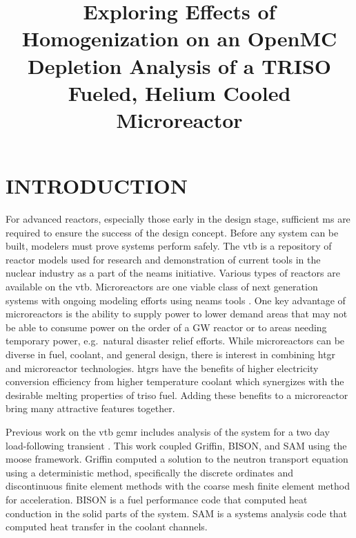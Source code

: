 \documentclass[letterpaper]{physor2024}
\title{Exploring Effects of Homogenization on an OpenMC Depletion Analysis of a TRISO Fueled, Helium Cooled Microreactor}
\begin{document}
\section{INTRODUCTION}\label{sec:intro}
For advanced reactors, especially those early in the design stage, sufficient \gls{ms} are required to ensure the success of the design concept. Before any system can be built, modelers must prove systems perform safely. The \gls{vtb} \cite{vtb2023} is a repository of reactor models used for research and demonstration of current tools in the nuclear industry as a part of the \gls{neams} initiative. Various types of reactors are available on the \gls{vtb}. Microreactors are one viable class of next generation systems with ongoing modeling efforts using \gls{neams} tools \cite{Stauff-preliminary-applications-2021, Stauff-applications-2022}. One key advantage of microreactors is the ability to supply power to lower demand areas that may not be able to consume power on the order of a GW reactor or to areas needing temporary power, e.g.~natural disaster relief efforts. While microreactors can be diverse in fuel, coolant, and general design, there is interest in combining \gls{htgr} and microreactor technologies. \glspl{htgr} have the benefits of higher electricity conversion efficiency from higher temperature coolant which synergizes with the desirable melting properties of \gls{triso} fuel. Adding these benefits to a microreactor bring many attractive features together.

Previous work on the \gls{vtb} \gls{gcmr} includes analysis of the system for a two day load-following transient \cite{Abdelhameed-ANS-2022}. This work coupled Griffin, BISON, and SAM using the \gls{moose} framework. Griffin computed a solution to the neutron transport equation using a deterministic method, specifically the discrete ordinates and discontinuous finite element methods with the coarse mesh finite element method for acceleration. BISON is a fuel performance code that computed heat conduction in the solid parts of the system. SAM is a systems analysis code that computed heat transfer in the coolant channels.
\end{document}

